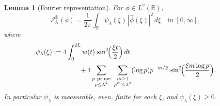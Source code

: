 \documentclass[11pt]{article}
\newtheorem{lemma}[theorem]{Lemma}
\theoremstyle{remark}
\newcommand{\R}{\mathbb R}
\newcommand{\1}{\mathbf 1}
\begin{document}
\begin{lemma}[Fourier representation]\label{lem:FourierRep}
For $\phi\in L^2(\R)$,
\[
\mathcal E_\lambda^{\R}(\phi)=\frac1{2\pi}\int_{\R}\psi_\lambda(\xi)\,|\widehat{\phi}(\xi)|^2\,d\xi
\quad\text{in }[0,\infty],
\]
where
\begin{align}
\psi_\lambda(\xi)
&:=4\int_0^{2L} w(t)\,\sin^2\!\Bigl(\frac{\xi t}{2}\Bigr)\,dt\notag\\
&\qquad\qquad
+4\sum_{\substack{p\ \mathrm{prime}\\ p\le \lambda^2}}\ \sum_{\substack{m\ge 1\\ p^m\le \lambda^2}}
(\log p)p^{-m/2}\,\sin^2\!\Bigl(\frac{\xi m\log p}{2}\Bigr).\label{eq:defpsi}
\end{align}
In particular $\psi_\lambda$ is measurable, even, finite for each $\xi$, and $\psi_\lambda(\xi)\ge 0$.
\end{lemma}
\end{document}

